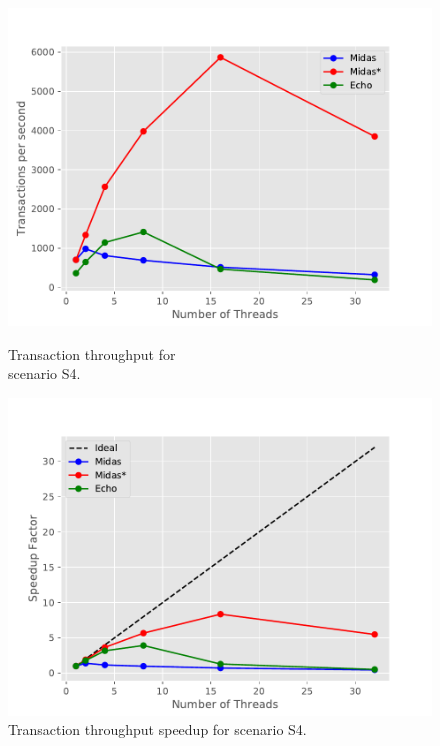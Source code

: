 \begin{figure}[h!]
\begin{minipage}[l]{0.50\textwidth}
    \includegraphics[width=\textwidth]{figures/bench/ttp-ll}
    \caption{Transaction throughput for\\scenario S4.}
    \label{fig:ttp-s4}
\end{minipage}
\begin{minipage}[l]{0.50\textwidth}
    \includegraphics[width=\textwidth]{figures/bench/spd-ll}
    \caption{Transaction throughput speedup for scenario S4.}
    \label{fig:spd-s4}
\end{minipage}
\begin{minipage}[l]{0.50\textwidth}

\end{minipage}
\end{figure}
